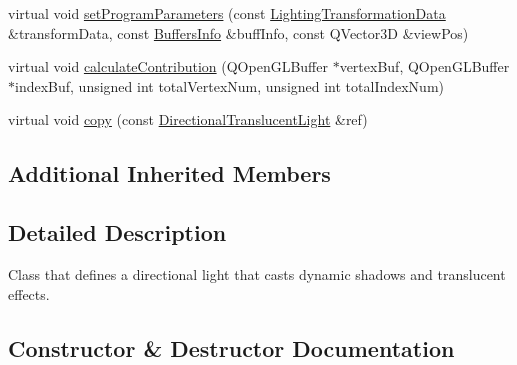 \begin{DoxyCompactItemize}
virtual void \mbox{\hyperlink{class_geometry_engine_1_1_geometry_world_item_1_1_geometry_light_1_1_directional_translucent_light_a3736cc700d4de793b45fe3e05c922bd1}{set\+Program\+Parameters}} (const \mbox{\hyperlink{class_geometry_engine_1_1_lighting_transformation_data}{Lighting\+Transformation\+Data}} \&transform\+Data, const \mbox{\hyperlink{class_geometry_engine_1_1_buffers_info}{Buffers\+Info}} \&buff\+Info, const Q\+Vector3D \&view\+Pos)
\item 
virtual void \mbox{\hyperlink{class_geometry_engine_1_1_geometry_world_item_1_1_geometry_light_1_1_directional_translucent_light_a3e178fedac23b432dbcdc03115abec09}{calculate\+Contribution}} (Q\+Open\+G\+L\+Buffer $\ast$vertex\+Buf, Q\+Open\+G\+L\+Buffer $\ast$index\+Buf, unsigned int total\+Vertex\+Num, unsigned int total\+Index\+Num)
\item 
virtual void \mbox{\hyperlink{class_geometry_engine_1_1_geometry_world_item_1_1_geometry_light_1_1_directional_translucent_light_aec73b781ada9048d5fcd5775c91eaa3e}{copy}} (const \mbox{\hyperlink{class_geometry_engine_1_1_geometry_world_item_1_1_geometry_light_1_1_directional_translucent_light}{Directional\+Translucent\+Light}} \&ref)
\end{DoxyCompactItemize}
\subsection*{Additional Inherited Members}


\subsection{Detailed Description}
Class that defines a directional light that casts dynamic shadows and translucent effects. 

\subsection{Constructor \& Destructor Documentation}
\mbox{\label{class_geometry_engine_1_1_geometry_world_item_1_1_geometry_light_1_1_directional_translucent_light_a4367b3ef7b69f251dbb702f06e693a94}} 
